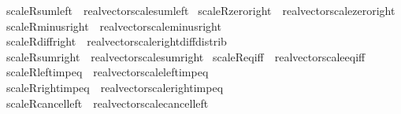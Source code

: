\begin{isabellebody}
\isamarkupfalse%
\ scaleR{\isacharunderscore}{\kern0pt}sum{\isacharunderscore}{\kern0pt}left\ {\isacharequal}{\kern0pt}\ real{\isacharunderscore}{\kern0pt}vector{\isachardot}{\kern0pt}scale{\isacharunderscore}{\kern0pt}sum{\isacharunderscore}{\kern0pt}left\isanewline
{}\isamarkupfalse%
\ scaleR{\isacharunderscore}{\kern0pt}zero{\isacharunderscore}{\kern0pt}right\ {\isacharequal}{\kern0pt}\ real{\isacharunderscore}{\kern0pt}vector{\isachardot}{\kern0pt}scale{\isacharunderscore}{\kern0pt}zero{\isacharunderscore}{\kern0pt}right\isanewline
{}\isamarkupfalse%
\ scaleR{\isacharunderscore}{\kern0pt}minus{\isacharunderscore}{\kern0pt}right\ {\isacharequal}{\kern0pt}\ real{\isacharunderscore}{\kern0pt}vector{\isachardot}{\kern0pt}scale{\isacharunderscore}{\kern0pt}minus{\isacharunderscore}{\kern0pt}right\isanewline
{}\isamarkupfalse%
\ scaleR{\isacharunderscore}{\kern0pt}diff{\isacharunderscore}{\kern0pt}right\ {\isacharequal}{\kern0pt}\ real{\isacharunderscore}{\kern0pt}vector{\isachardot}{\kern0pt}scale{\isacharunderscore}{\kern0pt}right{\isacharunderscore}{\kern0pt}diff{\isacharunderscore}{\kern0pt}distrib\isanewline
{}\isamarkupfalse%
\ scaleR{\isacharunderscore}{\kern0pt}sum{\isacharunderscore}{\kern0pt}right\ {\isacharequal}{\kern0pt}\ real{\isacharunderscore}{\kern0pt}vector{\isachardot}{\kern0pt}scale{\isacharunderscore}{\kern0pt}sum{\isacharunderscore}{\kern0pt}right\isanewline
{}\isamarkupfalse%
\ scaleR{\isacharunderscore}{\kern0pt}eq{\isacharunderscore}{\kern0pt}{}{\isacharunderscore}{\kern0pt}iff\ {\isacharequal}{\kern0pt}\ real{\isacharunderscore}{\kern0pt}vector{\isachardot}{\kern0pt}scale{\isacharunderscore}{\kern0pt}eq{\isacharunderscore}{\kern0pt}{}{\isacharunderscore}{\kern0pt}iff\isanewline
{}\isamarkupfalse%
\ scaleR{\isacharunderscore}{\kern0pt}left{\isacharunderscore}{\kern0pt}imp{\isacharunderscore}{\kern0pt}eq\ {\isacharequal}{\kern0pt}\ real{\isacharunderscore}{\kern0pt}vector{\isachardot}{\kern0pt}scale{\isacharunderscore}{\kern0pt}left{\isacharunderscore}{\kern0pt}imp{\isacharunderscore}{\kern0pt}eq\isanewline
{}\isamarkupfalse%
\ scaleR{\isacharunderscore}{\kern0pt}right{\isacharunderscore}{\kern0pt}imp{\isacharunderscore}{\kern0pt}eq\ {\isacharequal}{\kern0pt}\ real{\isacharunderscore}{\kern0pt}vector{\isachardot}{\kern0pt}scale{\isacharunderscore}{\kern0pt}right{\isacharunderscore}{\kern0pt}imp{\isacharunderscore}{\kern0pt}eq\isanewline
{}\isamarkupfalse%
\ scaleR{\isacharunderscore}{\kern0pt}cancel{\isacharunderscore}{\kern0pt}left\ {\isacharequal}{\kern0pt}\ real{\isacharunderscore}{\kern0pt}vector{\isachardot}{\kern0pt}scale{\isacharunderscore}{\kern0pt}cancel{\isacharunderscore}{\kern0pt}left\isanewline

\end{isabellebody}
